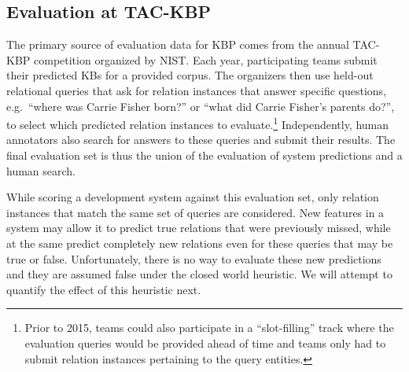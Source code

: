 \subsection{Evaluation at TAC-KBP}

The primary source of evaluation data for KBP comes from the annual TAC-KBP competition organized by NIST.\@ %
Each year, participating teams submit their predicted KBs for a provided corpus.
The organizers then use held-out relational queries that ask for relation instances that answer specific questions, e.g.\ ``where was Carrie Fisher born?'' or ``what did Carrie Fisher's parents do?'', to select which predicted relation instances to evaluate.\footnote{%
  Prior to 2015, teams could also participate in a ``slot-filling'' track where the evaluation queries would be provided ahead of time and teams only had to submit relation instances pertaining to the query entities.}
Independently, human annotators also search for answers to these queries and submit their results.
The final evaluation set is thus the union of the evaluation of system predictions and a human search.

While scoring a development system against this evaluation set, only relation instances that match the same set of queries are considered.
New features in a system may allow it to predict true relations that were previously missed, while at the same predict completely new relations even for these queries that may be true or false.
Unfortunately, there is no way to evaluate these new predictions and they are assumed false under the closed world heuristic.
We will attempt to quantify the effect of this heuristic next.
